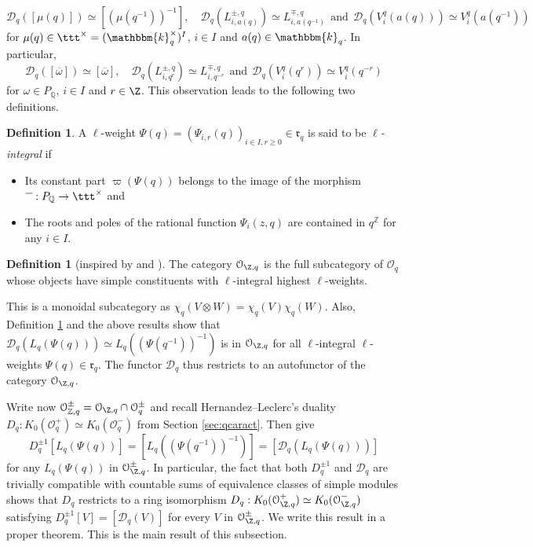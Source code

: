 \documentclass[11pt]{amsart}
\theoremstyle{definition}
\newtheorem{defn}[theorem]{Definition}
\theoremstyle{remark}
\numberwithin{equation}{section}
\begin{document}
$$ \mathcal{D}_q([\mu(q)]) \simeq [(\mu(q^{-1}))^{-1}],\quad \mathcal{D}_{q}(L_{i,a(q)}^{\pm,q}) \simeq L_{i,a(q^{-1})}^{\mp,q} \ \ \text{and}\ \ \mathcal{D}_{q}(V_i^{q}(a(q))) \simeq V_i^{q}(a(q^{-1}))$$
for $\mu(q)\in \ttt^{\times} = (\mathbbm{k}_q^{\times})^I$, $i\in I$ and $a(q)\in \mathbbm{k}_q$. In particular, 
$$ \mathcal{D}_q([\overline{\omega}]) \simeq [\overline{\omega}],\quad \mathcal{D}_{q}(L_{i,q^r}^{\pm,q}) \simeq L_{i,q^{-r}}^{\mp,q} \ \ \text{and}\ \ \mathcal{D}_{q}(V_i^{q}(q^r)) \simeq V_i^{q}(q^{-r})$$
for $\omega \in P_{\mathbb{Q}}$, $i\in I$ and $r\in \Z$. This observation leads to the following two definitions.
\begin{defn}\label{def:OZ} A $\ell$-weight $\Psi(q)=(\Psi_{i,r}(q))_{i\in I,r\geq 0}\in \mathfrak{r}_q$ is said to be \textit{$\ell$-integral} if 
\begin{itemize}
\item[(i)] Its constant part $\varpi(\Psi(q))$ belongs to the image of the morphism $\overline{\textcolor{white}{\alpha}} : P_{\mathbb{Q}} \rightarrow \ttt^{\times}$ and
\item[(ii)] The roots and poles of the rational function $\Psi_i(z,q)$ are contained in $q^{\mathbb{Z}}$ for any $i\in I$.
\end{itemize}
\end{defn}
\begin{defn}[inspired by {\cite{hl1}} and {\cite[Definition 4.1]{hl2}}]\label{def:OZ2} The category $\mathcal{O}_{\Z,q}$ is the full subcategory of $\mathcal{O}_q$ whose objects have simple constituents with $\ell$-integral highest $\ell$-weights.
\end{defn}
This is a monoidal subcategory as $\chi_q(V\otimes W) = \chi_q(V)\chi_q(W)$. Also, Definition \ref{def:OZ} and the above results show that $\mathcal{D}_q(L_q(\Psi(q))) \simeq L_q((\Psi(q^{-1}))^{-1})$ is in $\mathcal{O}_{\Z,q}$ for all $\ell$-integral $\ell$-weights $\Psi(q) \in \mathfrak{r}_q$. The functor $\mathcal{D}_q$ thus restricts to an autofunctor of the category $\mathcal{O}_{\Z,q}$. \par
Write now $\mathcal{O}_{\mathbb{Z},q}^{\pm} = \mathcal{O}_{\Z,q}\cap \mathcal{O}^{\pm}_q$ and recall Hernandez--Leclerc's duality $D_q:K_0(\mathcal{O}^+_q)\simeq K_0(\mathcal{O}_q^-)$ from Section \ref{sec:qcaract}. Then \cite[Theorem 7.9]{hl2} give
$$D_q^{\pm 1}[L_q(\Psi(q))]=[L_q((\Psi(q^{-1}))^{-1})]= [\mathcal{D}_q(L_q(\Psi(q)))]$$ for any $L_q(\Psi(q))$ in $\mathcal{O}_{\Z,q}^{\pm}$. In particular, the fact that both $D_q^{\pm 1}$ and $\mathcal{D}_q$ are trivially compatible with countable sums of equivalence classes of simple modules shows that $D_q$ restricts to a ring isomorphism $D_q: K_0(\mathcal{O}_{\Z,q}^+)\simeq K_0(\mathcal{O}_{\Z,q}^-)$ satisfying $ D_q^{\pm 1}[V] = [\mathcal{D}_q(V)]$ for every $V$ in $\mathcal{O}_{\Z,q}^{\pm}$. We write this result in a proper theorem. This is the main result of this subsection. 
\end{document}
